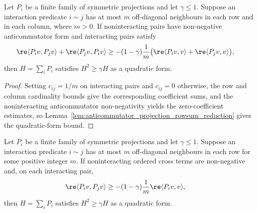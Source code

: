 \begin{lemma}
    \label{lem:finite_overlap_projection_anticommutator_reduction}
    \leanok
    Let $P_i$ be a finite family of symmetric projections and let
    $\gamma\le1$. Suppose an interaction predicate $i\sim j$ has at most $m$
    off-diagonal neighbours in each row and in each column, where $m>0$. If
    noninteracting pairs have non-negative anticommutator form and interacting
    pairs satisfy
    \begin{align}
        \re\langle P_i v,P_jv\rangle
        +\re\langle P_j v,P_iv\rangle
         & \ge-(1-\gamma)\frac{1}{m}
        \bigl(\re\langle P_i v,v\rangle
        +\re\langle P_j v,v\rangle\bigr), \notag
    \end{align}
    then $H=\sum_iP_i$ satisfies $H^2\ge\gamma H$ as a quadratic form.
\end{lemma}

\begin{proof}
    \leanok
    Setting $c_{ij}=1/m$ on interacting pairs and $c_{ij}=0$ otherwise, the row
    and column cardinality bounds give the corresponding coefficient sums, and
    the noninteracting anticommutator non-negativity yields the
    zero-coefficient estimates, so
    Lemma~\ref{lem:anticommutator_projection_rowsum_reduction} gives the
    quadratic-form bound.
\end{proof}

\begin{lemma}
    \label{lem:finite_overlap_projection_rowsum_reduction}
    \leanok
    Let $P_i$ be a finite family of symmetric projections and let
    $\gamma\le1$. Suppose an interaction predicate $i\sim j$ has at most $m$
    off-diagonal neighbours in each row for some positive integer $m$. If
    noninteracting ordered cross terms are non-negative and, on each interacting
    pair,
    \begin{align}
        \re\langle P_i v,P_jv\rangle
         & \ge-(1-\gamma)\frac{1}{m}\re\langle P_i v,v\rangle, \notag
    \end{align}
    then $H=\sum_iP_i$ satisfies $H^2\ge\gamma H$ as a quadratic form.
\end{lemma}

